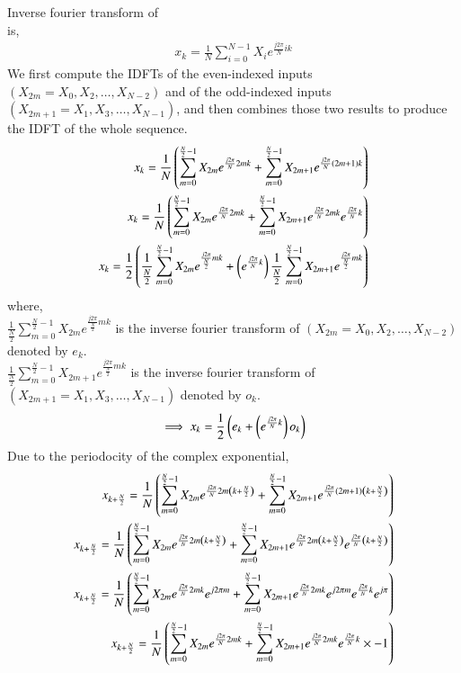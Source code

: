 \documentclass[journal,12pt,twocolumn]{IEEEtran}
\begin{document}
Inverse fourier transform of 
\\
 is,
\begin{align}
     x_{k} = \frac{1}{N} \sum _{i=0}^{N-1}X_{i}e^{\frac{j2\pi}{N}ik}
\end{align}
We first compute the IDFTs of the even-indexed inputs  $(X_{2m}=X_{0},X_{2},\ldots ,X_{N-2})$ and of the odd-indexed inputs $(X_{2m+1}=X_{1},X_{3},\ldots ,X_{N-1})$, and then combines those two results to produce the IDFT of the whole sequence.
\begin{align}
     x_{k} = \frac{1}{N} \left(\sum _{m=0}^{\frac{N}{2}-1}X_{2m}e^{\frac{j2\pi}{N}2mk} + \sum _{m=0}^{\frac{N}{2}-1}X_{2m+1}e^{\frac{j2\pi}{N}(2m+1)k}\right)
     \\
     x_{k} = \frac{1}{N} \left(\sum _{m=0}^{\frac{N}{2}-1}X_{2m}e^{\frac{j2\pi}{N}2mk} + \sum _{m=0}^{\frac{N}{2}-1}X_{2m+1}e^{\frac{j2\pi}{N}2mk} e^{\frac{j2\pi}{N}k}\right)
     \\
     x_{k} =\frac{1}{2} \left( \frac{1}{\frac{N}{2}}\sum _{m=0}^{\frac{N}{2}-1}X_{2m}e^{\frac{j2\pi}{\frac{N}{2}}mk} + \left( e^{\frac{j2\pi}{N}k}\right)\frac{1}{\frac{N}{2}}\sum _{m=0}^{\frac{N}{2}-1}X_{2m+1}e^{\frac{j2\pi}{\frac{N}{2}}mk}\right)
\end{align}
where,
\\
$\frac{1}{\frac{N}{2}}\sum _{m=0}^{\frac{N}{2}-1}X_{2m}e^{\frac{j2\pi}{\frac{N}{2}}mk}$ is the inverse fourier transform of $(X_{2m}=X_{0},X_{2},\ldots ,X_{N-2})$ denoted by $e_{k}$.
\\
$\frac{1}{\frac{N}{2}}\sum _{m=0}^{\frac{N}{2}-1}X_{2m+1}e^{\frac{j2\pi}{\frac{N}{2}}mk}$ is the inverse fourier transform of $(X_{2m+1}=X_{1},X_{3},\ldots ,X_{N-1})$ denoted by $o_{k}$.
\begin{align}
\implies x_{k} =\frac{1}{2} \left(  e_{k} + \left( e^{\frac{j2\pi}{N}k}\right)o_{k}\right)
\end{align}
Due to the periodocity of the complex exponential,
\\
\begin{align}
     x_{k+\frac{N}{2}} = \frac{1}{N} \left( \sum _{m=0}^{\frac{N}{2}-1}X_{2m}e^{\frac{j2\pi}{N}2m\left(k+\frac{N}{2}\right)} + \sum _{m=0}^{\frac{N}{2}-1}X_{2m+1}e^{\frac{j2\pi}{N}(2m+1)\left(k+\frac{N}{2}\right)}\right)
     \\
     x_{k+\frac{N}{2}} = \frac{1}{N} \left(\sum _{m=0}^{\frac{N}{2}-1}X_{2m}e^{\frac{j2\pi}{N}2m\left(k+\frac{N}{2}\right)} + \sum _{m=0}^{\frac{N}{2}-1}X_{2m+1}e^{\frac{j2\pi}{N}2m\left(k+\frac{N}{2}\right)} e^{\frac{j2\pi}{N}\left(k+\frac{N}{2}\right)}\right)
     \\
     x_{k+\frac{N}{2}} = \frac{1}{N} \left(\sum _{m=0}^{\frac{N}{2}-1}X_{2m}e^{\frac{j2\pi}{N}2mk}e^{j2\pi m} + \sum _{m=0}^{\frac{N}{2}-1}X_{2m+1}e^{\frac{j2\pi}{N}2mk}e^{j2\pi m} e^{\frac{j2\pi}{N}k}e^{j\pi}\right)
     \\
     x_{k+\frac{N}{2}} = \frac{1}{N} \left(\sum _{m=0}^{\frac{N}{2}-1}X_{2m}e^{\frac{j2\pi}{N}2mk} + \sum _{m=0}^{\frac{N}{2}-1}X_{2m+1}e^{\frac{j2\pi}{N}2mk}e^{\frac{j2\pi}{N}k}\times -1\right)
\end{align}
\end{document}
